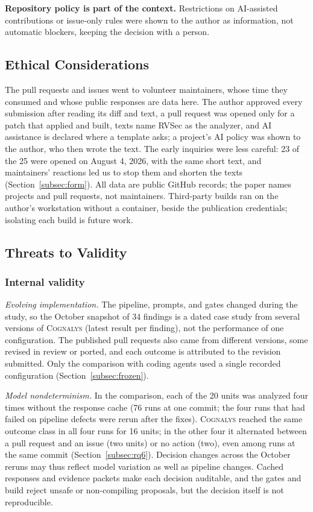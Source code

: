 \documentclass[conference]{IEEEtran}
\newcommand{\system}{\textsc{Cognalys}}
\begin{document}
\textbf{Repository policy is part of the context.} Restrictions on AI-assisted
contributions or issue-only rules were shown to the author as information, not
automatic blockers, keeping the decision with a person.

\subsection{Ethical Considerations}
\label{subsec:ethics}

The pull requests and issues went to volunteer maintainers, whose time they
consumed and whose public responses are data here. The author approved every
submission after reading its diff and text, a pull request was opened only for
a patch that applied and built, texts name RVSec as the analyzer, and AI
assistance is declared where a template asks; a project's AI policy was shown
to the author, who then wrote the text. The early inquiries were less careful:
23 of the 25 were opened on August 4, 2026, with the same short text, and
maintainers' reactions led us to stop them and shorten the texts
(Section~\ref{subsec:form}). All data are public GitHub records; the paper
names projects and pull requests, not maintainers. Third-party builds ran on
the author's workstation without a container, beside the publication
credentials; isolating each build is future work.

\subsection{Threats to Validity}
\label{subsec:threats}

\subsubsection{Internal validity}

\emph{Evolving implementation.} The pipeline, prompts, and gates changed during
the study, so the October snapshot of 34 findings is a dated case study from
several versions of \system{} (latest result per finding), not the performance
of one configuration. The published pull requests also came from different
versions, some revised in review or ported, and each outcome is attributed to
the revision submitted. Only the comparison with coding
agents used a single recorded configuration (Section~\ref{subsec:frozen}).

\emph{Model nondeterminism.} In the comparison, each of the 20 units was
analyzed four times without the response cache (76 runs at one commit; the
four runs that had failed on pipeline defects were rerun after the fixes).
\system{} reached the same outcome class in all four runs for 16 units; in the
other four it alternated between a pull request and an issue (two units) or no
action (two), even among runs at the same commit (Section~\ref{subsec:rq6}).
Decision changes across the October reruns may thus reflect model variation
as well as pipeline changes. Cached responses and evidence packets make each
decision auditable, and the gates and build reject unsafe or non-compiling
proposals, but the decision itself is not reproducible.
\end{document}
